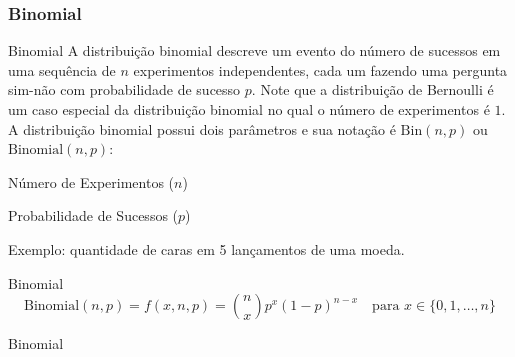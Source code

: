 \subsubsection{Binomial}
\begin{frame}{Binomial}
    A distribuição binomial descreve um evento do número de sucessos em uma sequência de $n$ experimentos independentes,
    cada um fazendo uma pergunta sim-não com probabilidade de sucesso $p$. Note que a distribuição de Bernoulli é
    um caso especial da distribuição binomial no qual o número de experimentos é $1$.
    \vfill
    A distribuição binomial possui dois parâmetros e sua notação é $\text{Bin}(n, p)$ ou $\text{Binomial}(n, p)$:
    \begin{vfilleditems}
        \item Número de Experimentos ($n$)
        \item Probabilidade de Sucessos ($p$)
    \end{vfilleditems}
    \vfill
    Exemplo: quantidade de caras em 5 lançamentos de uma moeda.
\end{frame}

\begin{frame}{Binomial}
    $$\text{Binomial}(n,p) = f(x, n, p) = \binom{n}{x}p^{x}(1-p)^{n-x} \quad \text{para $x \in \{0, 1, \dots, n\}$}$$
\end{frame}

\begin{frame}{Binomial}
  \centering
\end{frame}

